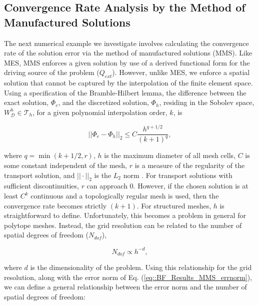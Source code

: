 \subsection{Convergence Rate Analysis by the Method of Manufactured Solutions}
\label{sec::BF_Results_MMS}

The next numerical example we investigate involves calculating the convergence rate of the solution error via the method of manufactured solutions (MMS). Like MES, MMS enforces a given solution by use of a derived functional form for the driving source of the problem ($Q_{ext}$). However, unlike MES, we enforce a spatial solution that cannot be captured by the interpolation of the finite element space. Using a specification of the Bramble-Hilbert \cite{bramble1970estimation} lemma, the difference between the exact solution, $\Phi_e$, and the discretized solution, $\Phi_h$, residing in the Sobolev space, $W_{\mathcal{D}}^h \in \mathcal{T}_h$, for a given polynomial interpolation order, $k$, is

\begin{equation}
\label{eq::BF_Results_MMS_errnorm}
|| \Phi_{e} - \Phi_h || _{2}  \leq C \frac{h^{q+1/2}}{(k+1)^q} ,
\end{equation}

\noindent where $q=\min(k+1/2,r )$, $h$ is the maximum diameter of all mesh cells, $C$ is some constant independent of the mesh, $r$ is a measure of the regularity of the transport solution, and $|| \cdot ||_2$ is the $L_2$ norm \cite{houston2000stabilized}. For transport solutions with sufficient discontinuities, $r$ can approach 0. However, if the chosen solution is at least $C^k$ continuous and a topologically regular mesh is used, then the convergence rate becomes strictly $(k+1)$. For structured meshes, $h$ is straightforward to define. Unfortunately, this becomes a problem in general for polytope meshes. Instead, the grid resolution can be related to the number of spatial degrees of freedom ($N_{dof}$),

\begin{equation}
\label{eq::BF_Results_MMS_dofres}
N_{dof} \propto h^{-d} ,
\end{equation}

\noindent where $d$ is the dimensionality of the problem. Using this relationship for the grid resolution, along with the error norm of Eq. (\ref{eq::BF_Results_MMS_errnorm}), we can define a general relationship between the error norm and the number of spatial degrees of freedom:

